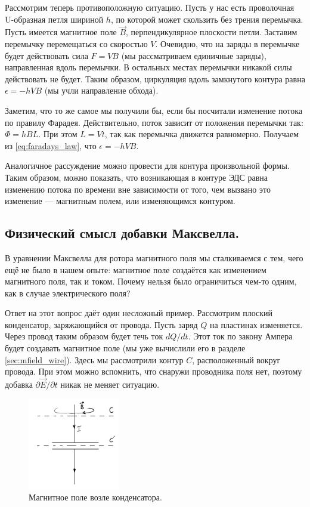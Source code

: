 \documentclass[11pt,a4paper]{article}
\numberwithin{equation}{section}
\newcommand{\pt}{\partial}
\newcommand{\eps}{\epsilon}
\begin{document}
Рассмотрим теперь противоположную ситуацию. Пусть у нас есть
проволочная U-образная петля шириной $h$, по которой может скользить без трения
перемычка. Пусть имеется магнитное поле $\vec{B}$, перпендикулярное
плоскости петли. Заставим перемычку перемещаться со скоростью
$V$. Очевидно, что на заряды в перемычке будет действовать сила $F =
V B$ (мы рассматриваем единичные заряды), направленная вдоль
перемычки. В остальных местах перемычки никакой силы действовать не
будет. Таким образом, циркуляция вдоль замкнутого контура равна
$\eps=-hVB$ (мы учли направление обхода). 

Заметим, что то же самое мы получили бы, если бы посчитали изменение
потока по правилу Фарадея. Действительно, поток зависит от положения
перемычки так: $\Phi = h B L$. При этом $L=Vt$, так как перемычка
движется равномерно. Получаем из \eqref{eq:faradays_law}, что $\eps =
-h VB$.

Аналогичное рассуждение можно провести для контура произвольной
формы. Таким образом, можно показать, что возникающая в контуре ЭДС
равна изменению потока по времени вне зависимости от того, чем вызвано
это изменение --- магнитным полем, или изменяющимся контуром. 

\subsection{Физический смысл добавки Максвелла. }
\label{sec:physical_sense_maxwell}

В уравнении Максвелла для ротора магнитного поля мы сталкиваемся с
тем, чего ещё не было в нашем опыте: магнитное поле создаётся как
изменением магнитного поля, так и током. Почему нельзя было
ограничиться чем-то одним, как в случае электрического поля? 

Ответ на этот вопрос даёт один несложный пример. Рассмотрим плоский
конденсатор, заряжающийся от провода. Пусть заряд $Q$ на пластинах
изменяется. Через провод таким образом будет течь ток $dQ/dt$. Этот
ток по закону Ампера будет создавать магнитное поле (мы уже вычислили
его в разделе \ref{sec:mfield_wire}). Здесь мы рассмотрили контур $C$,
расположенный вокруг провода. При этом можно вспомнить, что снаружи
проводника поля нет, поэтому добавка $\pt \vec{E}/\pt t$ никак не
меняет ситуацию.

\begin{figure}
  \vspace{-1cm}
  \begin{center}
  \includegraphics[width=4cm]{displacement.pdf}  
  \end{center}
  \vspace{-1cm}
  \caption{Магнитное поле возле конденсатора.}
  \label{fig:displacement}
\end{figure}
\end{document}
